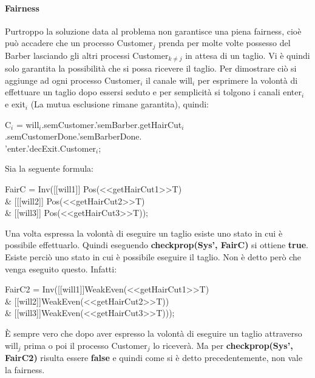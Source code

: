 \paragraph{Fairness}\mbox{}

Purtroppo la soluzione data al problema non garantisce una piena fairness, cioè può accadere che un processo \textsf{Customer$_{j}$} prenda per molte volte possesso del \textsf{Barber} lasciando gli altri processi \textsf{Customer$_{k\not=j}$} in attesa di un taglio. Vi è quindi solo garantita la possibilità che si possa ricevere il taglio.
Per dimostrare ciò si aggiunge ad ogni processo \textsf{Customer$_{i}$} il canale \textsf{will$_{i}$} per esprimere la volontà di effettuare un taglio dopo essersi seduto e per semplicità si tolgono i canali \textsf{enter$_{i}$} e \textsf{exit$_{i}$} (La mutua esclusione rimane garantita), quindi:

\textsf{C$_{i}$ = will$_{i}$.semCustomer.'semBarber.getHairCut$_{i}$.semCustomerDone.'semBarberDone.}\\
\textsf{'enter.'decExit.Customer$_{i}$;}

Sia la seguente formula:

\begin{center}
	\textsf{FairC = Inv([[will1]] Pos(<<getHairCut1>>T) \\\& [[[will2]] Pos(<<getHairCut2>>T) \\\& [[will3]] Pos(<<getHairCut3>>T)); }
\end{center}

Una volta espressa la volontà di eseguire un taglio esiste uno stato in cui è possibile effettuarlo. Quindi eseguendo \textbf{checkprop(Sys', FairC)} si ottiene \textbf{true}. Esiste perciò uno stato in cui è possibile eseguire il taglio. Non è detto però che venga eseguito questo. Infatti:

\begin{center}
	\textsf{FairC2 = Inv([[will1]]WeakEven(<<getHairCut1>>T) \\\& [[will2]]WeakEven(<<getHairCut2>>T)) \\\& [[will3]]WeakEven(<<getHairCut3>>T)));}
\end{center}

È sempre vero che dopo aver espresso la volontà di eseguire un taglio attraverso \textsf{will$_{j}$} prima o poi il processo \textsf{Customer$_{j}$} lo riceverà. Ma per\textbf{ checkprop(Sys', FairC2)} risulta essere \textbf{false} e quindi come si è detto precedentemente, non vale la fairness.


